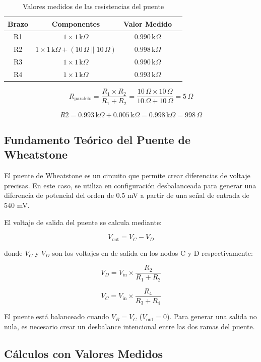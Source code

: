 \documentclass[a4paper,openany,12pt]{book}
\begin{document}
\begin{table}[h]
	\centering
	\begin{tabular}{|c|c|c|c|}
		\hline
		\textbf{Brazo} & \textbf{Componentes} & \textbf{Valor Medido}\\
		\hline
		R1 & \( 1 \times 1 \, \text{k}\Omega \) & \( 0.990 \, \text{k}\Omega \)  \\
		\hline
		R2 & \( 1 \times 1 \, \text{k}\Omega + (10 \, \Omega \parallel 10 \, \Omega) \) & \( 0.998 \, \text{k}\Omega \) \\
		\hline
		R3 & \( 1 \times 1 \, \text{k}\Omega \) & \( 0.990 \, \text{k}\Omega \)\\
		\hline
		R4 & \( 1 \times 1 \, \text{k}\Omega \) & \( 0.993 \, \text{k}\Omega \)\\
		\hline
	\end{tabular}
	\caption{Valores medidos de las resistencias del puente}
	\label{tab:resistencias}
\end{table}
\[
R_{\text{paralelo}} = \frac{R_1 \times R_2}{R_1 + R_2} = \frac{10 \, \Omega \times 10 \, \Omega}{10 \, \Omega + 10 \, \Omega} = 5 \, \Omega
\]

\[
R2 = 0.993 \, \text{k}\Omega + 0.005 \, \text{k}\Omega = 0.998 \, \text{k}\Omega = 998 \, \Omega
\]
\subsection{Fundamento Teórico del Puente de Wheatstone}

El puente de Wheatstone es un circuito que permite crear diferencias de voltaje precisas. En este caso, se utiliza en configuración desbalanceada para generar una diferencia de potencial del orden de 0.5 mV a partir de una señal de entrada de 540 mV.

El voltaje de salida del puente se calcula mediante:

\[
V_{\text{out}} = V_C - V_D
\]

donde \( V_C \) y \( V_D \) son los voltajes en de salida en los nodos C y D respectivamente:

\[
V_D= V_{\text{in}} \times \frac{R_2}{R_1 + R_2}
\]

\[
V_C = V_{\text{in}} \times \frac{R_4}{R_3 + R_4}
\]

El puente está balanceado cuando \( V_B = V_C \) (\( V_{\text{out}} = 0 \)). Para generar una salida no nula, es necesario crear un desbalance intencional entre las dos ramas del puente.

\subsection{Cálculos con Valores Medidos}
\end{document}
